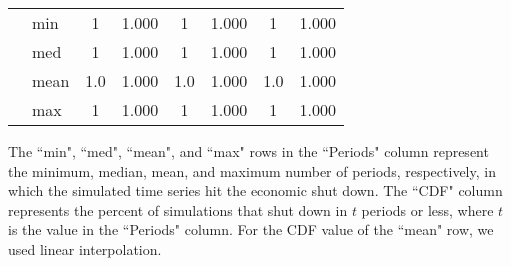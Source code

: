 \documentclass[letterpaper,12pt]{article}
\theoremstyle{definition}
\begin{document}
\begin{spacing}{1.5}
\begin{table}[htbp]
\begin{threeparttable}
\begin{tabular}{>{\small}c >{\small}l| >{\small}c >{\small}c| >{\small}c >{\small}c| >{\small}c >{\small}c}
      \hline
      \multirow{4}{*}{$\bar{H}=0.17$}
      & min & 1 & 1.000 & 1 & 1.000 & 1 & 1.000 \\
      & med & 1 & 1.000 & 1 & 1.000 & 1 & 1.000 \\
      & mean & 1.0 & 1.000 & 1.0 & 1.000 & 1.0 & 1.000 \\
      & max & 1 & 1.000 & 1 & 1.000 & 1 & 1.000 \\
      \hline\hline
    \end{tabular}
    \begin{tablenotes}
      \scriptsize{\item[]The ``min", ``med", ``mean", and ``max" rows in the ``Periods" column represent the minimum, median, mean, and maximum number of periods, respectively, in which the simulated time series hit the economic shut down. The ``CDF" column represents the percent of simulations that shut down in $t$ periods or less, where $t$ is the value in the ``Periods" column. For the CDF value of the ``mean" row, we used linear interpolation.}
    \end{tablenotes}
    \end{threeparttable}
  \end{table}


\end{spacing}
\end{document}
